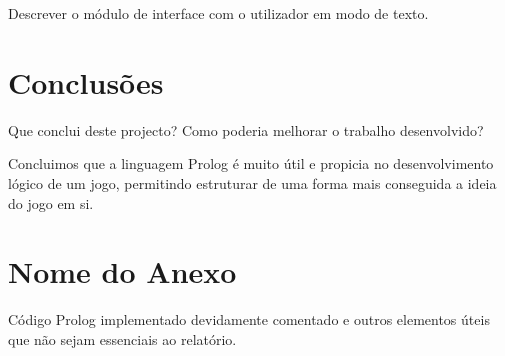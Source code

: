 \documentclass[a4paper]{article}
\begin{document}
Descrever o módulo de interface com o utilizador em modo de texto.


\section{Conclusões}
Que conclui deste projecto? Como poderia melhorar o trabalho desenvolvido?

Concluimos que a linguagem Prolog é muito útil e propicia no desenvolvimento lógico de um jogo, permitindo estruturar de uma forma mais conseguida a ideia do jogo em si.

\clearpage
{}
\renewcommand\refname{Bibliografia}



\newpage
\appendix
\section{Nome do Anexo}
Código Prolog implementado devidamente comentado e outros elementos úteis que não sejam essenciais ao relatório.
\end{document}

